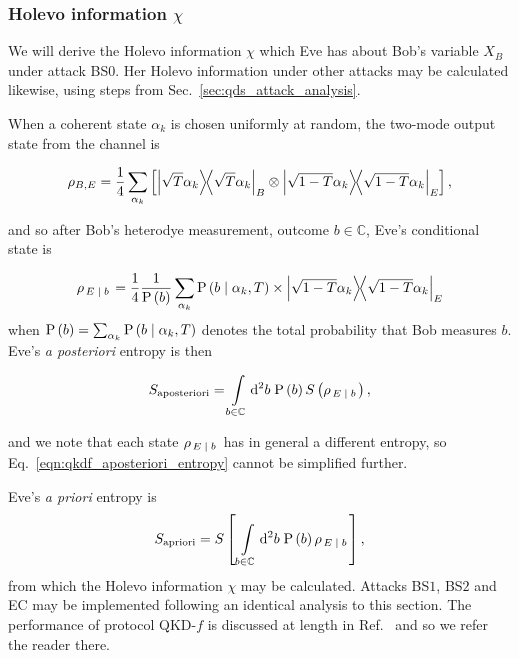 \subsubsection{Holevo information $\chi$}
We will derive the Holevo information $\chi$ which Eve has about Bob's variable $X_B$ under attack BS$0$. Her Holevo information under other attacks may be calculated likewise, using steps from Sec.~\ref{sec:qds_attack_analysis}.

When a coherent state $\alpha_k$ is chosen uniformly at random, the two-mode output state from the channel is

\begin{equation}
\rho_{B, E} = \frac{1}{4} \sum_{\alpha_k} \left[ \dyad{\sqrt{T}\alpha_k}_B \otimes \dyad{\sqrt{1-T}\alpha_k}_E\right],
\end{equation}

\noindent and so after Bob's heterodye measurement, outcome $b \in \mathbb{C}$, Eve's conditional state is

\begin{equation}\label{eqn:qkdf_eve_conditional}
\rho_{\left. E \given b\right.} = \frac{1}{4} \frac{1}{\text{P}\left(b\right)} \sum_{\alpha_k} \text{P}\left(b \given \alpha_k, T\right) \times \dyad{\sqrt{1-T}\alpha_k}_E
\end{equation}
when $\text{P}\left(b\right) = \sum_{\alpha_k}\text{P}\left(b \; \middle| \; \alpha_k, T\right)$ denotes the total probability that Bob measures $b$. Eve's \emph{a posteriori} entropy is then

\begin{equation}\label{eqn:qkdf_aposteriori_entropy}
S_{\text{aposteriori}} = \int\limits_{b \in \mathbb{C}} \mathop{}\!\mathrm{d^2} b \; \text{P}\left(b\right) S\left(\rho_{\left. E \; \middle| \; b \right.}\right),
\end{equation}

\noindent and we note that each state $\rho_{\left.E\; \middle| \; b \right.}$ has in general a different entropy, so Eq.~\ref{eqn:qkdf_aposteriori_entropy} cannot be simplified further. 

Eve's \emph{a priori} entropy is
\begin{equation}\label{eqn:qkdf_apriori_entropy}
S_{\text{apriori}} = S\left[\, \int\limits_{b \in \mathbb{C}} \mathop{}\!\mathrm{d^2} b \; \text{P}\left(b\right) \rho_{\left. E \; \middle| \; b \right.}\right],
\end{equation}
from which the Holevo information $\chi$ may be calculated. Attacks BS$1$, BS$2$ and EC may be implemented following an identical analysis to this section. The performance of protocol QKD-$f$ is discussed at length in Ref.~\cite{Papanastasiou2018} and so we refer the reader there. 



